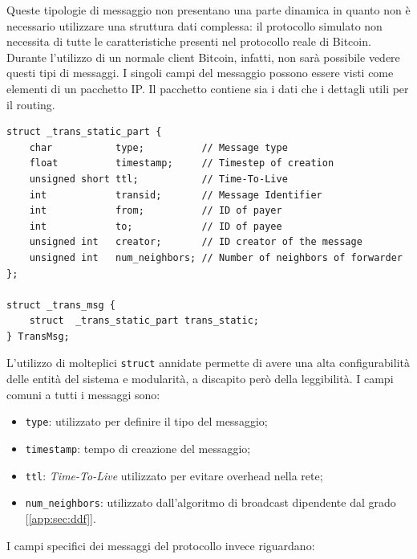 Queste tipologie di messaggio non presentano una parte dinamica in quanto non è necessario utilizzare una struttura dati complessa: il protocollo simulato non necessita di tutte le caratteristiche presenti nel protocollo reale di Bitcoin. Durante l'utilizzo di un normale client Bitcoin, infatti, non sarà possibile vedere questi tipi di messaggi.\newline
I singoli campi del messaggio possono essere visti come elementi di un pacchetto IP. Il pacchetto contiene sia i dati che i dettagli utili per il routing.
\begin{code}
\begin{verbatim}
struct _trans_static_part {
    char           type;          // Message type
    float          timestamp;     // Timestep of creation
    unsigned short ttl;           // Time-To-Live
    int            transid;       // Message Identifier
    int            from;          // ID of payer
    int            to;            // ID of payee
    unsigned int   creator;       // ID creator of the message
    unsigned int   num_neighbors; // Number of neighbors of forwarder
};

struct _trans_msg {
    struct  _trans_static_part trans_static;
} TransMsg;
\end{verbatim}
\end{code}
L'utilizzo di molteplici \texttt{struct} annidate permette di avere una alta configurabilità delle entità del sistema e modularità, a discapito però della leggibilità.
I campi comuni a tutti i messaggi sono:
\begin{itemize}
    \item \texttt{type}: utilizzato per definire il tipo del messaggio;
    \item \texttt{timestamp}: tempo di creazione del messaggio;
    \item \texttt{ttl}: \textit{Time-To-Live} utilizzato per evitare overhead nella rete;
    \item \texttt{num\_neighbors}: utilizzato dall'algoritmo di broadcast dipendente dal grado [\ref{app:sec:ddf}].
\end{itemize}
I campi specifici dei messaggi del protocollo invece riguardano:
